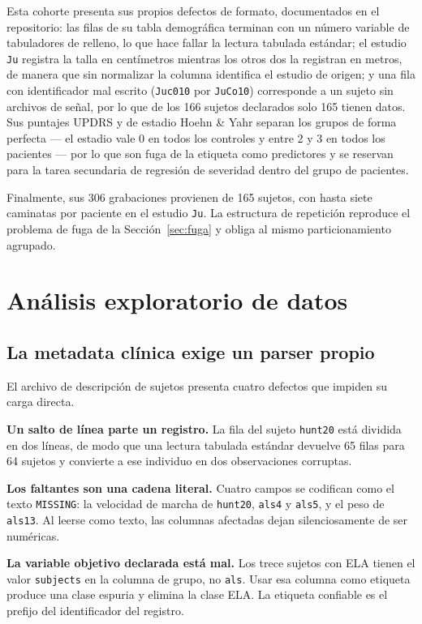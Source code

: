 \documentclass[conference]{IEEEtran}
\begin{document}
Esta cohorte presenta sus propios defectos de formato, documentados en el repositorio: las filas de su tabla demográfica terminan con un número variable de tabuladores de relleno, lo que hace fallar la lectura tabulada estándar; el estudio \texttt{Ju} registra la talla en centímetros mientras los otros dos la registran en metros, de manera que sin normalizar la columna identifica el estudio de origen; y una fila con identificador mal escrito (\texttt{Juc010} por \texttt{JuCo10}) corresponde a un sujeto sin archivos de señal, por lo que de los 166 sujetos declarados solo 165 tienen datos. Sus puntajes UPDRS y de estadio Hoehn \& Yahr \cite{hoehn1967} separan los grupos de forma perfecta --- el estadio vale 0 en todos los controles y entre 2 y 3 en todos los pacientes --- por lo que son fuga de la etiqueta como predictores y se reservan para la tarea secundaria de regresión de severidad dentro del grupo de pacientes.

Finalmente, sus 306 grabaciones provienen de 165 sujetos, con hasta siete caminatas por paciente en el estudio \texttt{Ju}. La estructura de repetición reproduce el problema de fuga de la Sección~\ref{sec:fuga} y obliga al mismo particionamiento agrupado.

\section{Análisis exploratorio de datos}

\subsection{La metadata clínica exige un parser propio}

El archivo de descripción de sujetos presenta cuatro defectos que impiden su carga directa.

\textbf{Un salto de línea parte un registro.} La fila del sujeto \texttt{hunt20} está dividida en dos líneas, de modo que una lectura tabulada estándar devuelve 65 filas para 64 sujetos y convierte a ese individuo en dos observaciones corruptas.

\textbf{Los faltantes son una cadena literal.} Cuatro campos se codifican como el texto \texttt{MISSING}: la velocidad de marcha de \texttt{hunt20}, \texttt{als4} y \texttt{als5}, y el peso de \texttt{als13}. Al leerse como texto, las columnas afectadas dejan silenciosamente de ser numéricas.

\textbf{La variable objetivo declarada está mal.} Los trece sujetos con ELA tienen el valor \texttt{subjects} en la columna de grupo, no \texttt{als}. Usar esa columna como etiqueta produce una clase espuria y elimina la clase ELA. La etiqueta confiable es el prefijo del identificador del registro.
\end{document}
